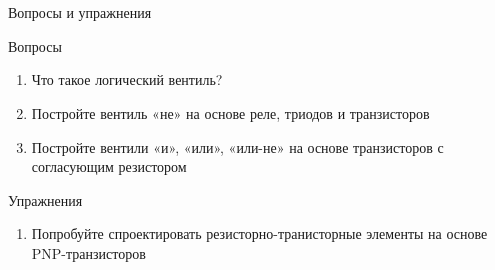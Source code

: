 \documentclass[xetex,aspectratio=43]{beamer}
\begin{document}
\section*{}

\begin{frame}{Вопросы и упражнения}
    \begin{block}{Вопросы}
        \begin{enumerate}
        \item
          Что такое логический вентиль?
        \item
          Постройте вентиль «не» на основе реле, триодов и транзисторов
        \item
          Постройте вентили «и», «или», «или-не» на основе транзисторов с
          согласующим резистором
        \end{enumerate}
    \end{block}

    \begin{block}{Упражнения}
    \begin{enumerate}
        \item Попробуйте спроектировать резисторно-транисторные элементы на основе PNP-транзисторов
    \end{enumerate}
\end{block}

\end{frame}

\postamble
\end{document}
